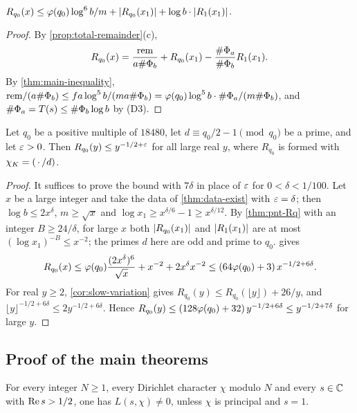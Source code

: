 \begin{proposition}\label{prop:R-at-x}
$R_{q_0}(x)\le\varphi(q_0)\log^6b/m+\lvert R_{q_0}(x_1)\rvert+\log b\cdot\lvert R_1(x_1)\rvert$.
\end{proposition}

\begin{proof}
By \cref{prop:total-remainder}(c),
\[
  R_{q_0}(x)=\frac{\mathrm{rem}}{a\#\Phi_b}+R_{q_0}(x_1)-\frac{\#\Phi_a}{\#\Phi_b}R_1(x_1).
\]
By \cref{thm:main-inequality}, $\mathrm{rem}/(a\#\Phi_b)\le fa\log^5b/(ma\#\Phi_b)
=\varphi(q_0)\log^5b\cdot\#\Phi_a/(m\#\Phi_b)$, and $\#\Phi_a=T(s)\le\#\Phi_b\log b$ by (D3).
\end{proof}

\begin{theorem}\label{thm:one-sided-bound}
Let $q_0$ be a positive multiple of $18480$, let $d\equiv q_0/2-1\pmod{q_0}$ be a prime, and let
$\varepsilon>0$. Then $R_{q_0}(y)\le y^{-1/2+\varepsilon}$ for all large real $y$, where $R_{q_0}$ is formed with
$\chi_K=(\,\cdot\,/d)$.
\end{theorem}

\begin{proof}
It suffices to prove the bound with $7\delta$ in place of $\varepsilon$ for $0<\delta<1/100$. Let $x$ be a large
integer and take the data of \cref{thm:data-exist} with $\varepsilon=\delta$; then $\log b\le2x^\delta$,
$m\ge\sqrt x$ and $\log x_1\ge x^{\delta/6}-1\ge x^{\delta/12}$. By \cref{thm:pnt-Rq} with an integer
$B\ge24/\delta$, for large $x$ both $\lvert R_{q_0}(x_1)\rvert$ and $\lvert R_1(x_1)\rvert$ are at most
$(\log x_1)^{-B}\le x^{-2}$; the primes $d$ here are odd and prime to $q_0$.  gives
\[
  R_{q_0}(x)\le\varphi(q_0)\frac{(2x^\delta)^6}{\sqrt x}+x^{-2}+2x^\delta x^{-2}
  \le(64\varphi(q_0)+3)\,x^{-1/2+6\delta}.
\]
For real $y\ge2$, \cref{cor:slow-variation} gives $R_{q_0}(y)\le R_{q_0}(\lfloor y\rfloor)+26/y$, and
$\lfloor y\rfloor^{-1/2+6\delta}\le2y^{-1/2+6\delta}$. Hence
$R_{q_0}(y)\le(128\varphi(q_0)+32)\,y^{-1/2+6\delta}\le y^{-1/2+7\delta}$ for large $y$.
\end{proof}

\subsection{Proof of the main theorems}\label{ss:proof-main}

\begin{theorem}\label{thm:grh-half-plane}
For every integer $N\ge1$, every Dirichlet character $\chi$ modulo $N$ and every $s\in\mathbb{C}$ with
$\operatorname{Re} s>1/2$, one has $L(s,\chi)\neq0$, unless $\chi$ is principal and $s=1$.
\end{theorem}

